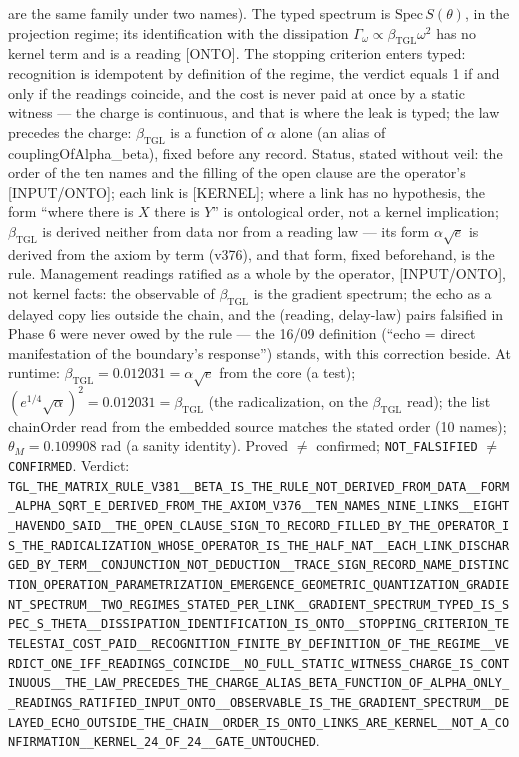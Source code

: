 \documentclass[11pt]{article}
\newcommand{\bTGL}{\beta_{\mathrm{TGL}}}\newcommand{\Msun}{M_{\odot}}\newcommand{\TGL}{\mathrm{TGL}}
\theoremstyle{definition}\newtheorem{deriv}{Derivation}
\begin{document}
are the same family under two names). The typed spectrum is $\mathrm{Spec}\,S(\theta)$, in the projection regime; its identification with the dissipation $\Gamma_\omega\propto\bTGL\omega^2$ has no kernel term and is a reading \textsf{[ONTO]}. The stopping criterion enters typed: recognition is idempotent by definition of the regime, the verdict equals 1 if and only if the readings coincide, and the cost is never paid at once by a static witness --- the charge is continuous, and that is where the leak is typed; the law precedes the charge: $\bTGL$ is a function of $\alpha$ alone (an alias of \textsf{couplingOfAlpha\_beta}), fixed before any record. Status, stated without veil: the order of the ten names and the filling of the open clause are the operator's \textsf{[INPUT/ONTO]}; each link is \textsf{[KERNEL]}; where a link has no hypothesis, the form ``where there is $X$ there is $Y$'' is ontological order, not a kernel implication; $\bTGL$ is derived neither from data nor from a reading law --- its form $\alpha\sqrt e$ is derived from the axiom by term (v376), and that form, fixed beforehand, is the rule. Management readings ratified as a whole by the operator, \textsf{[INPUT/ONTO]}, not kernel facts: the observable of $\bTGL$ is the gradient spectrum; the echo as a delayed copy lies outside the chain, and the (reading, delay-law) pairs falsified in Phase 6 were never owed by the rule --- the 16/09 definition (``echo = direct manifestation of the boundary's response'') stands, with this correction beside. At runtime: $\bTGL=0.012031=\alpha\sqrt e$ from the core (a test); $(e^{1/4}\sqrt\alpha)^2=0.012031=\bTGL$ (the radicalization, on the $\bTGL$ read); the list \textsf{chainOrder} read from the embedded source matches the stated order (10 names); $\theta_M=0.109908$ rad (a sanity identity). Proved $\neq$ confirmed; \texttt{NOT\_FALSIFIED} $\neq$ \texttt{CONFIRMED}. Verdict: \texttt{TGL\_THE\_MATRIX\_RULE\_V381\_\_BETA\_IS\_THE\_RULE\_NOT\_DERIVED\_FROM\_DATA\_\_FORM\_ALPHA\_SQRT\_E\_DERIVED\_FROM\_THE\_AXIOM\_V376\_\_TEN\_NAMES\_NINE\_LINKS\_\_EIGHT\_HAVENDO\_SAID\_\_THE\_OPEN\_CLAUSE\_SIGN\_TO\_RECORD\_FILLED\_BY\_THE\_OPERATOR\_IS\_THE\_RADICALIZATION\_WHOSE\_OPERATOR\_IS\_THE\_HALF\_NAT\_\_EACH\_LINK\_DISCHARGED\_BY\_TERM\_\_CONJUNCTION\_NOT\_DEDUCTION\_\_TRACE\_SIGN\_RECORD\_NAME\_DISTINCTION\_OPERATION\_PARAMETRIZATION\_EMERGENCE\_GEOMETRIC\_QUANTIZATION\_GRADIENT\_SPECTRUM\_\_TWO\_REGIMES\_STATED\_PER\_LINK\_\_GRADIENT\_SPECTRUM\_TYPED\_IS\_SPEC\_S\_THETA\_\_DISSIPATION\_IDENTIFICATION\_IS\_ONTO\_\_STOPPING\_CRITERION\_TETELESTAI\_COST\_PAID\_\_RECOGNITION\_FINITE\_BY\_DEFINITION\_OF\_THE\_REGIME\_\_VERDICT\_ONE\_IFF\_READINGS\_COINCIDE\_\_NO\_FULL\_STATIC\_WITNESS\_CHARGE\_IS\_CONTINUOUS\_\_THE\_LAW\_PRECEDES\_THE\_CHARGE\_ALIAS\_BETA\_FUNCTION\_OF\_ALPHA\_ONLY\_\_READINGS\_RATIFIED\_INPUT\_ONTO\_\_OBSERVABLE\_IS\_THE\_GRADIENT\_SPECTRUM\_\_DELAYED\_ECHO\_OUTSIDE\_THE\_CHAIN\_\_ORDER\_IS\_ONTO\_LINKS\_ARE\_KERNEL\_\_NOT\_A\_CONFIRMATION\_\_KERNEL\_24\_OF\_24\_\_GATE\_UNTOUCHED}.
\end{document}
